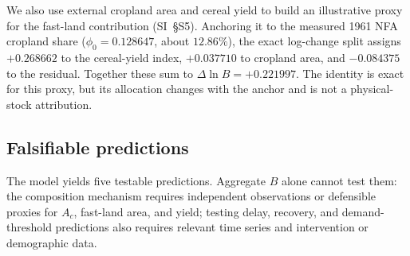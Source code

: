 We also use external cropland area and cereal yield to build an illustrative proxy for the fast-land contribution (SI~\S S5). Anchoring it to the measured 1961 NFA cropland share ($\phi_0=0.128647$, about $12.86\%$), the exact log-change split assigns $+0.268662$ to the cereal-yield index, $+0.037710$ to cropland area, and $-0.084375$ to the residual. Together these sum to $\Delta\ln B=+0.221997$. The identity is exact for this proxy, but its allocation changes with the anchor and is not a physical-stock attribution.

\subsection{Falsifiable predictions}\label{sec:predictions}

The model yields five testable predictions. Aggregate $B$ alone cannot test them: the composition mechanism requires independent observations or defensible proxies for $A_c$, fast-land area, and yield; testing delay, recovery, and demand-threshold predictions also requires relevant time series and intervention or demographic data.
